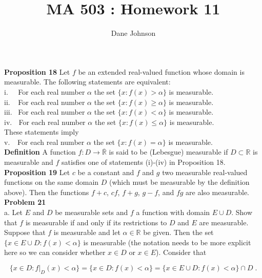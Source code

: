 \documentclass[a4paper]{article}
\title{MA 503 : Homework 11}
\author{Dane Johnson}
\begin{document}
\maketitle

{\bf Proposition 18} Let $f$ be an extended real-valued function whose domain is measurable. The following statements are equivalent:\\


i. $\; \; \,$ For each real number $\alpha$ the set $\{x : f(x) > \alpha \}$ is measurable.\\
ii. $\; \,$ For each real number $\alpha$ the set $\{x : f(x) \geq \alpha \}$ is measurable.\\
iii. $\,$ For each real number $\alpha$ the set $\{x : f(x) < \alpha \}$ is measurable.\\
iv. $\; $ For each real number $\alpha$ the set $\{x : f(x) \leq \alpha \}$ is measurable.\\
These statements imply\\
v. $\; \; \, $For each real number $\alpha$ the set $\{x : f(x) = \alpha\}$ is measurable. \\

{\bf Definition} A function $f: D \rightarrow \overline{\mathbb{R}}$ is said to be (Lebesgue) measurable if $D \subset \mathbb{R}$ is measurable and $f$ satisfies one of statements (i)-(iv) in Proposition 18. \\

{\bf Proposition 19} Let $c$ be a constant and $f$ and $g$ two measurable real-valued functions on the same domain $D$ (which must be measurable by the definition above). Then the functions $f+c$, $cf$, $f+g$, $g-f$, and $fg$ are also measurable. \\

{\bf Problem 21}\\

a. Let $E$ and $D$ be measurable sets and $f$ a function with domain $E\cup D$. Show that $f$ is measurable if and only if its restrictions to $D$ and $E$ are measurable. \\

Suppose that $f$ is measurable and let $\alpha \in \mathbb{R}$ be given. Then the set $\{x \in E\cup D : f(x) < \alpha\}$ is measurable (the notation needs to be more explicit here so we can consider whether $x \in D$ or $x \in E$). Consider that

$$\{x \in D : f\rvert_D(x) < \alpha\} = \{x \in D : f(x) < \alpha\} = \{x \in E\cup D : f(x) < \alpha\} \cap D \;.$$
\end{document}
